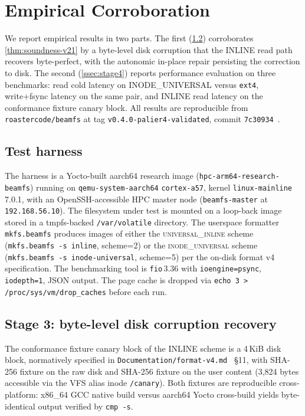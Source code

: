 \section{Empirical Corroboration}\label{sec:empirical}

We report empirical results in two parts. The first
(\cref{ssec:stage3}) corroborates \cref{thm:soundness-v21} by a
byte-level disk corruption that the INLINE read path recovers
byte-perfect, with the autonomic in-place repair persisting the
correction to disk. The second (\cref{ssec:stage4}) reports
performance evaluation on three benchmarks: read cold latency on
INODE\_UNIVERSAL versus \texttt{ext4}, write+fsync latency on the
same pair, and INLINE read latency on the conformance fixture
canary block. All results are reproducible from
\texttt{roastercode/beamfs} at tag
\texttt{v0.4.0-palier4-validated}, commit
\texttt{7c30934}~\cite{beamfs-impl}.

\subsection{Test harness}

The harness is a Yocto-built aarch64 research image
(\texttt{hpc-arm64-research-beamfs}) running on
\texttt{qemu-system-aarch64} \texttt{cortex-a57}, kernel
\texttt{linux-mainline} 7.0.1, with an OpenSSH-accessible HPC
master node (\texttt{beamfs-master} at \texttt{192.168.56.10}).
The filesystem under test is mounted on a loop-back image stored
in a tmpfs-backed \texttt{/var/volatile} directory. The userspace
formatter \texttt{mkfs.beamfs} produces images of either the
\textsc{universal\_inline} scheme (\texttt{mkfs.beamfs -s inline}, scheme=2) or the
\textsc{inode\_universal} scheme (\texttt{mkfs.beamfs -s inode-universal}, scheme=5)
per the on-disk format v4 specification. The benchmarking tool is
\texttt{fio}\,3.36 with \texttt{ioengine=psync},
\texttt{iodepth=1}, JSON output. The page cache is dropped via
\texttt{echo 3 > /proc/sys/vm/drop\_caches} before each run.

\subsection{Stage 3: byte-level disk corruption recovery}\label{ssec:stage3}

The conformance fixture canary block of the INLINE scheme is a
4\,KiB disk block, normatively specified in
\texttt{Documentation/format-v4.md}~\cite{beamfs-impl} \S 11, with
SHA-256 fixture
\texttt{}
on the raw disk and SHA-256 fixture
\texttt{}
on the user content (3{,}824 bytes accessible via the VFS alias
inode \texttt{/canary}). Both fixtures are reproducible
cross-platform: x86\_64 GCC native build versus aarch64 Yocto
cross-build yields byte-identical output verified by \texttt{cmp -s}.

